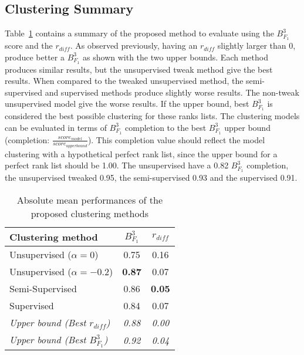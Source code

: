 \subsection{Clustering Summary}

Table~\ref{tab:clustering_evaluation_summary} contains a summary of the proposed method to evaluate using the $B^3_{F_1}$ score and the $r_{diff}$.
As observed previously, having an $r_{diff}$ slightly larger than 0, produce better a $B^3_{F_1}$ as shown with the two upper bounds.
Each method produces similar results, but the unsupervised tweak method give the best results.
When compared to the tweaked unsupervised method, the semi-supervised and supervised methods produce slightly worse results.
The non-tweak unsupervised model give the worse results.
If the upper bound, best $B^3_{F_1}$ is considered the best possible clustering for these ranks lists.
The clustering models can be evaluated in terms of $B^3_{F_1}$ completion to the best $B^3_{F_1}$ upper bound (completion: $\frac{score_{model}}{score_{upper bound}}$).
This completion value should reflect the model clustering with a hypothetical perfect rank list, since the upper bound for a perfect rank list should be 1.00.
The unsupervised have a 0.82 $B^3_{F_1}$ completion, the unsupervised tweaked 0.95, the semi-supervised 0.93 and the supervised 0.91.

\begin{table}
  \centering
  \caption{Absolute mean performances of the proposed clustering methods}
  \label{tab:clustering_evaluation_summary}
  \begin{tabular}{l c c}
    \toprule
    Clustering method              & $B^3_{F_1}$ & $r_{diff}$ \\
    \midrule
    Unsupervised ($\alpha = 0$)    & 0.75 & 0.16 \\
    Unsupervised ($\alpha = -0.2$) & \textbf{0.87} & 0.07 \\
    Semi-Supervised                & 0.86 & \textbf{0.05} \\
    Supervised                     & 0.84 & 0.07 \\
    \midrule
    \textit{Upper bound (Best $r_{diff}$)}  & \textit{0.88} & \textit{0.00} \\
    \textit{Upper bound (Best $B^3_{F_1}$)} & \textit{0.92} & \textit{0.04} \\
    \bottomrule
  \end{tabular}
\end{table}
